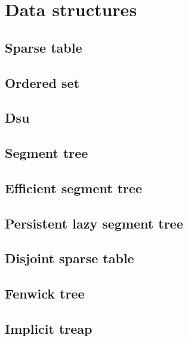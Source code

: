 \section{Data structures}

\subsection{Sparse table}

\subsection{Ordered set}

\subsection{Dsu}

\subsection{Segment tree}

\subsection{Efficient segment tree}

\subsection{Persistent lazy segment tree}

\subsection{Disjoint sparse table}

\subsection{Fenwick tree}

\subsection{Implicit treap}
